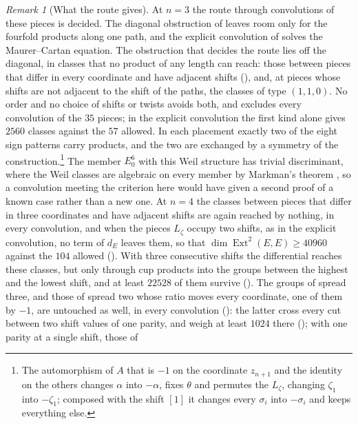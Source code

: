 \documentclass[11pt,reqno]{amsart}
\theoremstyle{plain}
\theoremstyle{definition}
\theoremstyle{remark}
\newtheorem{remark}[theorem]{Remark}
\DeclareMathOperator{\Ext}{Ext}
\begin{document}
\begin{remark}[What the route gives]\label{rem:convolutionsopen}
At $n=3$ the route through convolutions of these pieces is decided. The
diagonal obstruction of  leaves room only for the
fourfold products along one path, and the explicit convolution of
 solves the Maurer--Cartan equation. The
obstruction that decides the route lies off the diagonal, in classes that no
product of any length can reach: those between pieces that differ in every coordinate and have
adjacent shifts (), and, at pieces whose shifts are not
adjacent to the shift of the paths, the classes of type $(1,1,0)$. No order
and no choice of shifts or twists avoids both, and
 excludes every convolution of the $35$ pieces; in
the explicit convolution the first kind alone gives $2560$ classes against
the $57$ allowed. In each placement exactly two of the eight sign patterns
carry products, and the two are exchanged by a symmetry of the
construction.\footnote{The automorphism of $A$ that is $-1$ on the coordinate
$z_{n+1}$ and the identity on the others changes $\alpha$ into $-\alpha$,
fixes $\theta$ and permutes the $L_{\zeta}$, changing $\zeta_{1}$ into
$-\zeta_{1}$; composed with the shift $[1]$ it changes every $\sigma_{i}$
into $-\sigma_{i}$ and keeps everything else.} The member $E_{0}^{6}$ with
this Weil structure has trivial discriminant, where the Weil classes are
algebraic on every member by Markman's theorem \cite{Mar25a,Mar25b}, so a
convolution meeting the criterion here would have given a second proof of a
known case rather than a new one. At $n=4$ the classes between pieces that
differ in three coordinates and have adjacent shifts are again reached by
nothing, in every convolution, and when the pieces $L_{\zeta}$ occupy two
shifts, as in the explicit convolution, no term of $d_{E}$ leaves them, so
that $\dim\Ext^{2}(E,E)\ge40960$ against the $104$ allowed
(). With three consecutive shifts the
differential reaches these classes, but only through cup products into the
groups between the highest and the lowest shift, and at least $22528$ of
them survive (). The groups of spread three, and
those of spread two whose ratio moves every coordinate, one of them by $-1$,
are untouched as well, in every convolution
(): the latter cross every cut between
two shift values of one parity, and weigh at least $1024$ there
(); with one parity at a single shift, those of

\end{remark}
\end{document}
